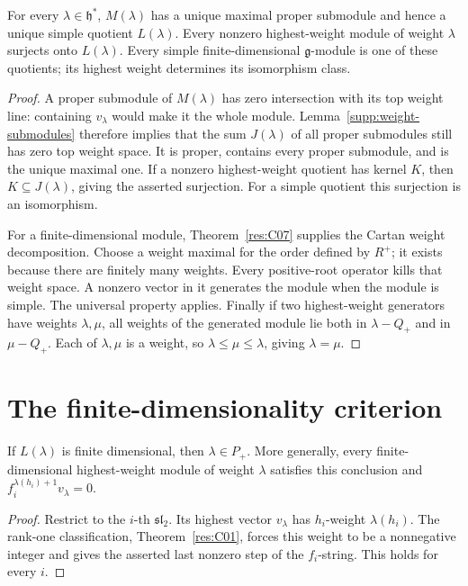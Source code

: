 \begin{theorem}
\label{res:G03}
For every \(\lambda\in\mathfrak h^*\), \(M(\lambda)\) has a unique
maximal proper submodule and hence a unique simple quotient
\(L(\lambda)\). Every nonzero highest-weight module of weight
\(\lambda\) surjects onto \(L(\lambda)\).
Every simple finite-dimensional \(\mathfrak g\)-module is one of
these quotients; its highest weight determines its isomorphism class.
\end{theorem}
\begin{proof}
A proper submodule of \(M(\lambda)\) has zero intersection with
its top weight line: containing \(v_\lambda\) would make it the
whole module. Lemma~\ref{supp:weight-submodules} therefore implies
that the sum \(J(\lambda)\) of all proper submodules still has zero
top weight space. It is proper, contains every proper submodule,
and is the unique maximal one. If a nonzero highest-weight quotient
has kernel \(K\), then \(K\subseteq J(\lambda)\), giving the asserted
surjection. For a simple quotient this surjection is an isomorphism.

For a finite-dimensional module, Theorem~\ref{res:C07} supplies
the Cartan weight decomposition. Choose a weight maximal for the
order defined by \(R^+\); it exists because there are finitely many
weights. Every positive-root operator kills that weight space.
A nonzero vector in it generates the module when the module is
simple. The universal property applies.
Finally if two highest-weight generators have weights \(\lambda,\mu\),
all weights of the generated module lie both in \(\lambda-Q_+\)
and in \(\mu-Q_+\). Each of \(\lambda,\mu\) is a weight, so
\(\lambda\leq\mu\leq\lambda\), giving \(\lambda=\mu\).
\end{proof}

\section{The finite-dimensionality criterion}

\begin{proposition}
\label{res:G04}
If \(L(\lambda)\) is finite dimensional, then \(\lambda\in P_+\).
More generally, every finite-dimensional highest-weight module of
weight \(\lambda\) satisfies this conclusion and
\(f_i^{\lambda(h_i)+1}v_\lambda=0\).
\end{proposition}
\begin{proof}
Restrict to the \(i\)-th \(\mathfrak{sl}_2\).
Its highest vector \(v_\lambda\) has \(h_i\)-weight \(\lambda(h_i)\).
The rank-one classification, Theorem~\ref{res:C01}, forces this
weight to be a nonnegative integer and gives the asserted last
nonzero step of the \(f_i\)-string. This holds for every \(i\).
\end{proof}

